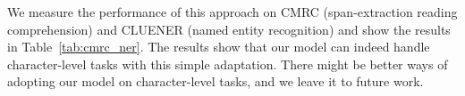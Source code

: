 We measure the performance of this approach on CMRC (span-extraction reading comprehension) and CLUENER (named entity recognition) and show the results in Table~\ref{tab:cmrc_ner}. The results show that our model can indeed handle character-level tasks with this simple adaptation. There might be better ways of adopting our model on character-level tasks, and we leave it to future work.

